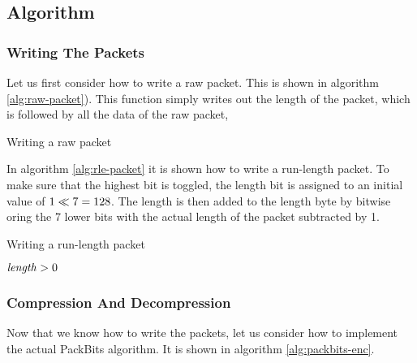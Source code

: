 \subsection{Algorithm}

\subsubsection{Writing The Packets}

Let us first consider how to write a raw packet. This is shown in
algorithm \ref{alg:raw-packet}). This function simply writes out the
length of the packet, which is followed by all the data of the raw
packet,

\begin{algorithm}
  \caption{Writing a raw packet}
  \label{alg:raw-packet}
  \begin{algorithmic}[1]
    \State {}
    \State {}
    \EndForEach
    \EndFunction
  \end{algorithmic}
\end{algorithm}

In algorithm \ref{alg:rle-packet} it is shown how to write a
run-length packet. To make sure that the highest bit is toggled, the
length bit is assigned to an initial value of $1 \ll 7 =
128$. The length is then added to the length byte by bitwise oring the
7 lower bits with the actual length of the packet subtracted by 1.

\begin{algorithm}
  \caption{Writing a run-length packet}
  \label{alg:rle-packet}
  \begin{algorithmic}[1]
    \Require $\mathit{length} > 0$
    \State {}
    \State {}
    \EndFunction
  \end{algorithmic}
\end{algorithm}

\subsubsection{Compression And Decompression}
\label{sec:compr-decompr}

Now that we know how to write the packets, let us consider how to
implement the actual PackBits \rle algorithm. It is shown in algorithm
\ref{alg:packbits-enc}.

